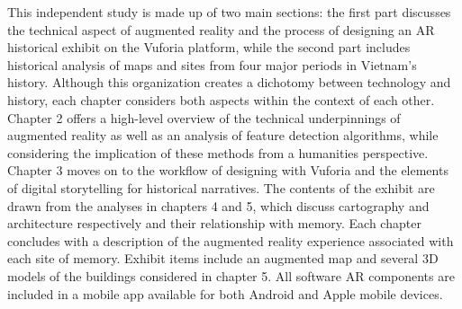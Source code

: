 This independent study is made up of two main sections: the first part discusses the technical aspect of augmented reality and the process of designing an AR historical exhibit on the Vuforia platform, while the second part includes historical analysis of maps and sites from four major periods in Vietnam’s history. Although this organization creates a dichotomy between technology and history, each chapter considers both aspects within the context of each other. Chapter 2 offers a high-level overview of the technical underpinnings of augmented reality as well as an analysis of feature detection algorithms, while considering the implication of these methods from a humanities perspective. Chapter 3 moves on to the workflow of designing with Vuforia and the elements of digital storytelling for historical narratives. The contents of the exhibit are drawn from the analyses in chapters 4 and 5, which discuss cartography and architecture respectively and their relationship with memory. Each chapter concludes with a description of the augmented reality experience associated with each site of memory. Exhibit items include an augmented map and several 3D models of the buildings considered in chapter 5. All software AR components are included in a mobile app available for both Android and Apple mobile devices.

\en

